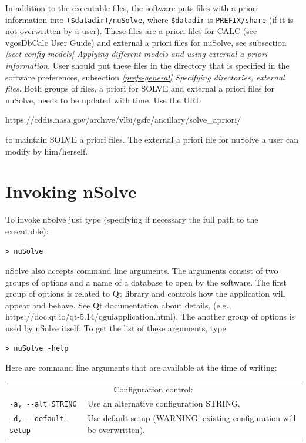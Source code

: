 \documentclass [10pt,letterpaper]{report}
\newcommand{\nuSolve}{\greektext n\latintext Solve}
\begin{document}
{In addition to the executable files, the software puts files with a priori
information into {\tt (\$datadir)/nuSolve}, where {\tt \$datadir} is
{\tt PREFIX/share} (if it is not overwritten by a user). These files are
a priori files for CALC (see vgosDbCalc User Guide) and external a priori
files for nuSolve, see subsection
\emph{\ref{sect-config-models} Applying different models and using external a priori information}.
User should put these files in the directory that is specified in the
software preferences, subsection \emph{\ref{prefs-general} Specifying directories, external files}.
Both groups of files, a priori for SOLVE and external a priori files
for nuSolve, needs to be updated with time. Use the URL
\begin{center}
https://cddis.nasa.gov/archive/vlbi/gsfc/ancillary/solve\_apriori/
\end{center}
to maintain SOLVE a priori files. The external a priori file for nuSolve
a user can modify by him/herself.




%
%
\chapter{Invoking \nuSolve{}}
\label{chapter-invokation}

To invoke \nuSolve{} just type (specifying if necessary the full path
to the executable):
\begin{verbatim}
> nuSolve
\end{verbatim}
\noindent
\nuSolve{} also accepts command line arguments. The arguments consist of
two groups of options and a name of a database to open by the software.
The first group of options is related to Qt library and controls how the
application will appear and behave. See Qt documentation about details,
(e.g., https://doc.qt.io/qt-5.14/qguiapplication.html).
The another group of options is used by \nuSolve{} itself. To get the
list of these arguments, type

\begin{verbatim}
> nuSolve -help
\end{verbatim}
\noindent
Here are command line arguments that are available at the time of writing:
\vspace{5mm}

\begin{tabular}{p{\leftSp}p{\riteSp}}
\multicolumn{2}{c}{Configuration control:}\\
{\tt -a, -{}-alt=STRING}        & Use an alternative configuration STRING.\\
{\tt -d, -{}-default-setup}     & Use default setup (WARNING: existing configuration will be overwritten).\\
\end{tabular}
\vspace{5mm}

}
\end{document}
